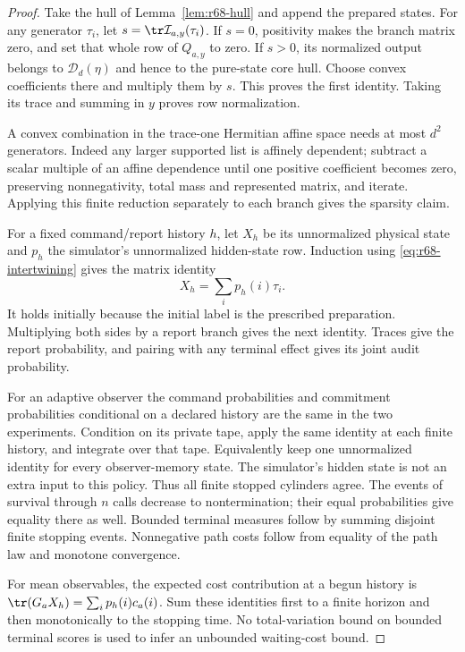 \begin{proof}
Take the hull of Lemma~\ref{lem:r68-hull} and append the prepared states. For any generator $\tau_i$, let $s=\tr\mathcal I_{a,y}(\tau_i)$. If $s=0$, positivity makes the branch matrix zero, and set that whole row of $Q_{a,y}$ to zero. If $s>0$, its normalized output belongs to $\mathcal D_d(\eta)$ and hence to the pure-state core hull. Choose convex coefficients there and multiply them by $s$. This proves the first identity. Taking its trace and summing in $y$ proves row normalization.

A convex combination in the trace-one Hermitian affine space needs at most $d^2$ generators. Indeed any larger supported list is affinely dependent; subtract a scalar multiple of an affine dependence until one positive coefficient becomes zero, preserving nonnegativity, total mass and represented matrix, and iterate. Applying this finite reduction separately to each branch gives the sparsity claim.

For a fixed command/report history $h$, let $X_h$ be its unnormalized physical state and $p_h$ the simulator's unnormalized hidden-state row. Induction using \eqref{eq:r68-intertwining} gives the matrix identity
\begin{equation}\label{eq:r68-history}
 X_h=\sum_i p_h(i)\tau_i.
\end{equation}
It holds initially because the initial label is the prescribed preparation. Multiplying both sides by a report branch gives the next identity. Traces give the report probability, and pairing with any terminal effect gives its joint audit probability.

For an adaptive observer the command probabilities and commitment probabilities conditional on a declared history are the same in the two experiments. Condition on its private tape, apply the same identity at each finite history, and integrate over that tape. Equivalently keep one unnormalized identity for every observer-memory state. The simulator's hidden state is not an extra input to this policy. Thus all finite stopped cylinders agree. The events of survival through $n$ calls decrease to nontermination; their equal probabilities give equality there as well. Bounded terminal measures follow by summing disjoint finite stopping events. Nonnegative path costs follow from equality of the path law and monotone convergence.

For mean observables, the expected cost contribution at a begun history is $\tr(G_aX_h)=\sum_i p_h(i)c_a(i)$. Sum these identities first to a finite horizon and then monotonically to the stopping time. No total-variation bound on bounded terminal scores is used to infer an unbounded waiting-cost bound.
\end{proof}


